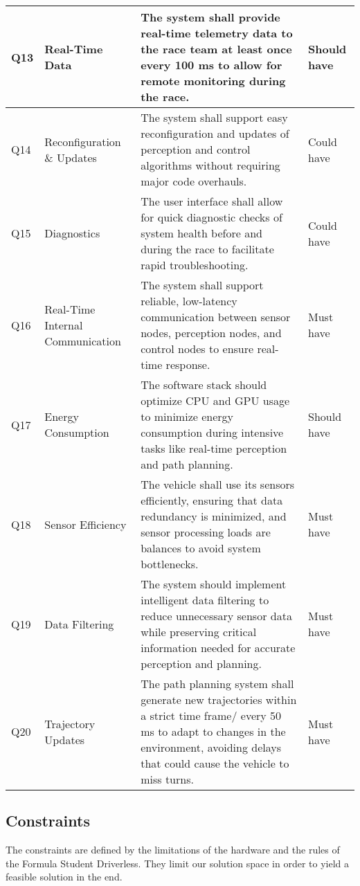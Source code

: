\begin{center}
\begin{longtable}{ | m{2em} | m{10em} | m{16em} | m{8em} | }
		\hline
		Q13 & Real-Time Data & The system shall provide real-time telemetry data to the race team at least once every 100 ms to allow for remote monitoring during the race. & Should have \\
		\hline
		Q14 & Reconfiguration \& Updates & The system shall support easy reconfiguration and updates of perception and control algorithms without requiring major code overhauls. & Could have \\
		\hline
		Q15 & Diagnostics & The user interface shall allow for quick diagnostic checks of system health before and during the race to facilitate rapid troubleshooting. & Could have \\
		\hline
		Q16 & Real-Time Internal Communication & The system shall support reliable, low-latency communication between sensor nodes, perception nodes, and control nodes to ensure real-time response. & Must have \\
		\hline
		Q17 & Energy Consumption & The software stack should optimize CPU and GPU usage to minimize energy consumption during intensive tasks like real-time perception and path planning. & Should have \\
		\hline
		Q18 & Sensor Efficiency & The vehicle shall use its sensors efficiently, ensuring that data redundancy is minimized, and sensor processing loads are balances to avoid system bottlenecks. & Must have \\
		\hline
		Q19 & Data Filtering & The system should implement intelligent data filtering to reduce unnecessary sensor data while preserving critical information needed for accurate perception and planning. & Must have \\
		\hline
		Q20 & Trajectory Updates & The path planning system shall generate new trajectories within a strict time frame/ every 50 ms to adapt to changes in the environment, avoiding delays that could cause the vehicle to miss turns. & Must have 
	\end{longtable}
\end{center}


\subsection{Constraints}

The constraints are defined by the limitations of the hardware and the rules of the Formula Student Driverless. They limit our solution space in order to yield a feasible solution in the end.

